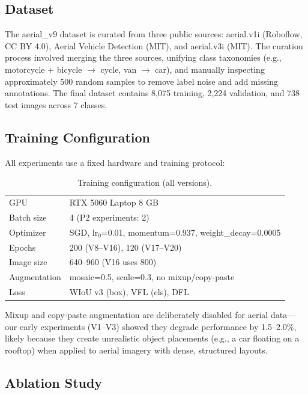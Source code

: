 \documentclass[11pt]{article}
\begin{document}
\subsection{Dataset}

The aerial\_v9 dataset is curated from three public sources: aerial.v1i (Roboflow, CC BY 4.0),
Aerial Vehicle Detection (MIT), and aerial.v3i (MIT). The curation process involved merging the
three sources, unifying class taxonomies (e.g., motorcycle + bicycle $\rightarrow$ cycle,
van $\rightarrow$ car), and manually inspecting approximately 500 random samples to remove label
noise and add missing annotations. The final dataset contains 8,075 training, 2,224 validation,
and 738 test images across 7 classes.

\subsection{Training Configuration}

All experiments use a fixed hardware and training protocol:

\begin{table}[H]
\centering
\caption{Training configuration (all versions).}
\begin{tabular}{ll}
\toprule
GPU & RTX 5060 Laptop 8 GB \\
Batch size & 4 (P2 experiments: 2) \\
Optimizer & SGD, lr$_{0}$=0.01, momentum=0.937, weight\_decay=0.0005 \\
Epochs & 200 (V8--V16), 120 (V17--V20) \\
Image size & 640--960 (V16 uses 800) \\
Augmentation & mosaic=0.5, scale=0.3, no mixup/copy-paste \\
Loss & WIoU v3 (box), VFL (cls), DFL \\
\bottomrule
\end{tabular}
\end{table}

Mixup and copy-paste augmentation are deliberately disabled for aerial data—our early experiments
(V1--V3) showed they degrade performance by 1.5--2.0\%, likely because they create unrealistic
object placements (e.g., a car floating on a rooftop) when applied to aerial imagery with dense,
structured layouts.

\subsection{Ablation Study}
\end{document}
